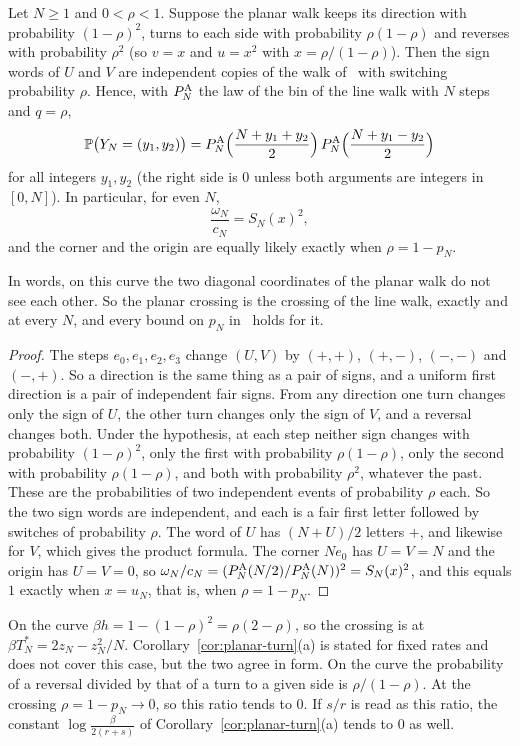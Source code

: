 \begin{proposition}\label{prop:product}
Let $N\ge1$ and $0<\rho<1$. Suppose the planar walk keeps its direction with probability
$(1-\rho)^2$, turns to each side with probability $\rho(1-\rho)$ and reverses with probability
$\rho^2$ (so $v=x$ and $u=x^2$ with $x=\rho/(1-\rho)$). Then the sign words of $U$ and $V$ are
independent copies of the walk of~\cite{paperA} with switching probability $\rho$. Hence, with
$P^{\rm A}_N$ the law of the bin of the line walk with $N$ steps and $q=\rho$,
\[
 \mathbb{P}\bigl(Y_N=(y_1,y_2)\bigr)
 =P^{\rm A}_N\Bigl(\frac{N+y_1+y_2}2\Bigr)\,P^{\rm A}_N\Bigl(\frac{N+y_1-y_2}2\Bigr)
\]
for all integers $y_1,y_2$ (the right side is $0$ unless both arguments are integers in $[0,N]$).
In particular, for even $N$,
\[
 \frac{\omega_N}{c_N}=S_N(x)^2,
\]
and the corner and the origin are equally likely exactly when $\rho=1-p_N$.
\end{proposition}

In words, on this curve the two diagonal coordinates of the planar walk do not see each other. So
the planar crossing is the crossing of the line walk, exactly and at every $N$, and every bound
on $p_N$ in~\cite{paperA} holds for it.

\begin{proof}
The steps $e_0,e_1,e_2,e_3$ change $(U,V)$ by $(+,+)$, $(+,-)$, $(-,-)$ and $(-,+)$. So a
direction is the same thing as a pair of signs, and a uniform first direction is a pair of
independent fair signs. From any direction one turn changes only the sign of $U$, the other turn
changes only the sign of $V$, and a reversal changes both. Under the hypothesis, at each step
neither sign changes with probability $(1-\rho)^2$, only the first with probability
$\rho(1-\rho)$, only the second with probability $\rho(1-\rho)$, and both with probability
$\rho^2$, whatever the past. These are the probabilities of two independent events of probability
$\rho$ each. So the two sign words are independent, and each is a fair first letter followed by
switches of probability $\rho$. The word of $U$ has $(N+U)/2$ letters $+$, and likewise for $V$,
which gives the product formula. The corner $Ne_0$ has $U=V=N$ and the origin has $U=V=0$, so
$\omega_N/c_N=(P^{\rm A}_N(N/2)/P^{\rm A}_N(N))^2=S_N(x)^2$, and this equals $1$ exactly when $x=u_N$,
that is, when $\rho=1-p_N$.
\end{proof}

On the curve $\beta h=1-(1-\rho)^2=\rho(2-\rho)$, so the crossing is at
$\beta T^*_N=2z_N-z_N^2/N$. Corollary~\ref{cor:planar-turn}(a) is stated for fixed rates and does
not cover this case, but the two agree in form. On the curve the probability of a reversal
divided by that of a turn to a given side is $\rho/(1-\rho)$. At the crossing $\rho=1-p_N\to0$, so
this ratio tends to $0$. If $s/r$ is read as this ratio, the constant $\log\frac\beta{2(r+s)}$ of
Corollary~\ref{cor:planar-turn}(a) tends to $0$ as well.

